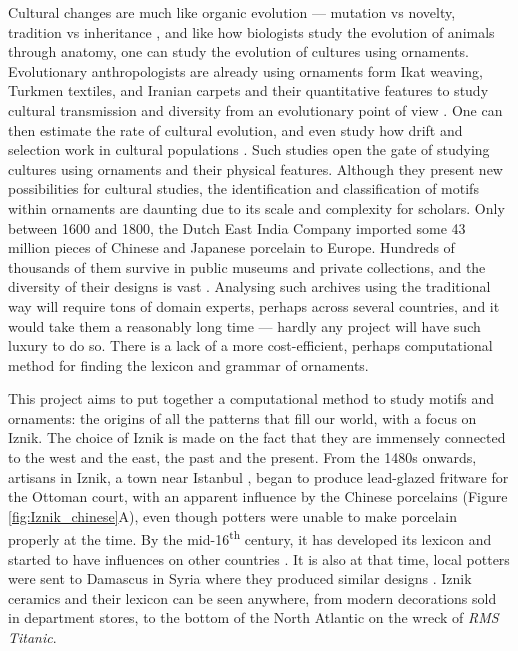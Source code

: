 \documentclass[11pt]{article}
\begin{document}
Cultural changes are much like organic evolution --- mutation vs novelty, tradition vs inheritance \parencite{Mesoudi2011}, and like how biologists study the evolution of animals through anatomy, one can study the evolution of cultures using ornaments. Evolutionary anthropologists are already using ornaments form Ikat weaving, Turkmen textiles, and Iranian carpets and their quantitative features to study cultural transmission and diversity from an evolutionary point of view \parencite{Tehrani2002, Tehrani2009, Buckley2012}. One can then estimate the rate of cultural evolution, and even study how drift and selection work in cultural populations \parencite{Lambert2017, leroi2020neutral}. Such studies open the gate of studying cultures using ornaments and their physical features. Although they present new possibilities for cultural studies, the identification and classification of motifs within ornaments are daunting due to its scale and complexity for scholars. Only between 1600 and 1800, the Dutch East India Company imported some 43 million pieces of Chinese and Japanese porcelain to Europe. Hundreds of thousands of them survive in public museums and private collections, and the diversity of their designs is vast \parencite{Campus2014}. Analysing such archives using the traditional way will require tons of domain experts, perhaps across several countries, and it would take them a reasonably long time --- hardly any project will have such luxury to do so. There is a lack of a more cost-efficient, perhaps computational method for finding the lexicon and grammar of ornaments. \par
This project aims to put together a computational method to study motifs and ornaments: the origins of all the patterns that fill our world, with a focus on Iznik. The choice of Iznik is made on the fact that they are immensely connected to the west and the east, the past and the present. From the 1480s onwards, artisans in Iznik, a town near Istanbul \parencite{necipouglu1989international}, began to produce lead-glazed fritware for the Ottoman court, with an apparent influence by the Chinese porcelains (Figure \ref{fig:Iznik_chinese}A), even though potters were unable to make porcelain properly \parencite{carswell1998iznik} at the time. By the mid-16\textsuperscript{th} century, it has developed its lexicon and started to have influences on other countries \parencite{canby2005islamic}. It is also at that time, local potters were sent to Damascus in Syria where they produced similar designs \parencite{Millner2015}. Iznik ceramics and their lexicon can be seen anywhere, from modern decorations sold in department stores, to the bottom of the North Atlantic on the wreck of \emph{RMS Titanic}.\par
\end{document}
